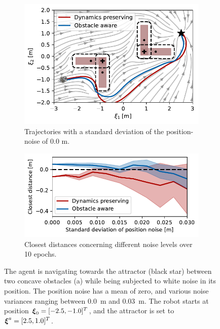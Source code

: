 \begin{figure}
    \centering
    \begin{subfigure}{\columnwidth}
      \centerline{\includegraphics[width=\textwidth]{figures/trajectory_position_noise}}
      \caption{Trajectories with a standard deviation of the position-noise of 0.0 m.}
      \label{fig:trajectory_position_noise}
    \end{subfigure}
    \begin{subfigure}{\columnwidth}
    \includegraphics[width=\textwidth]{figures/comparison_position_noise}
      \caption{Closest distances concerning different noise levels over 10 epochs.}
      \label{fig:comparison_position_noise}
    \end{subfigure}
	\caption{
 The agent is navigating towards the attractor (black star) between two concave obstacles (a) while being subjected to white noise in its position. The position noise has a mean of zero, and various noise variances ranging between \qty{0.0}{m} and \qty{0.03}{m}. The robot starts at position $\boldsymbol{\xi}_0 = [-2.5, -1.0]^T$, and the attractor is set to $\boldsymbol{\xi}^a = [2.5, 1.0]^T$.
 }
\label{fig:position_noise}
\end{figure}


